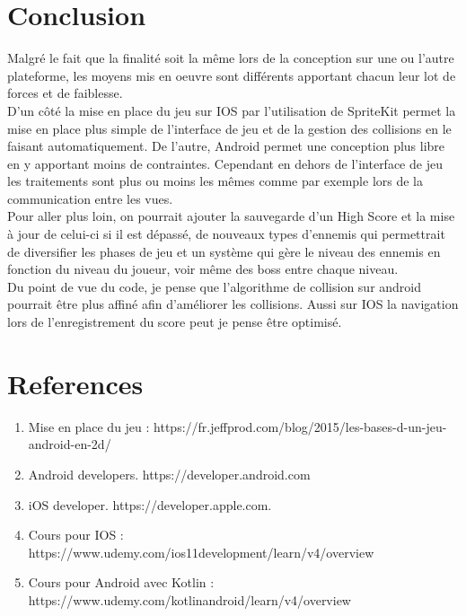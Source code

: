\documentclass{article}
\begin{document}
\section{Conclusion}
Malgré le fait que la finalité soit la même lors de la conception sur une ou l'autre plateforme, les moyens mis en oeuvre sont différents apportant chacun leur lot de forces et de faiblesse.\\
D'un côté la mise en place du jeu sur IOS par l'utilisation de SpriteKit permet la mise en place plus simple de l'interface de jeu et de la gestion des collisions en le faisant automatiquement. De l'autre, Android permet une conception plus libre en y apportant moins de contraintes. Cependant en dehors de l'interface de jeu les traitements sont plus ou moins les mêmes comme par exemple lors de la communication entre les vues.\\
Pour aller plus loin, on pourrait ajouter la sauvegarde d'un High Score et la mise à jour de celui-ci si il est dépassé, de nouveaux types d'ennemis qui permettrait de diversifier les phases de jeu et un système qui gère le niveau des ennemis en fonction du niveau du joueur, voir même des boss entre chaque niveau.\\
Du point de vue du code, je pense que l'algorithme de collision sur android pourrait être plus affiné afin d'améliorer les collisions.
Aussi sur IOS la navigation lors de l'enregistrement du score peut je pense être optimisé.

\section*{References}

\begin{enumerate}
    \item Mise en place du jeu : https://fr.jeffprod.com/blog/2015/les-bases-d-un-jeu-android-en-2d/
    \item Android developers. https://developer.android.com
    \item iOS developer. https://developer.apple.com.
    \item Cours pour IOS : https://www.udemy.com/ios11development/learn/v4/overview
    \item Cours pour Android avec Kotlin : https://www.udemy.com/kotlinandroid/learn/v4/overview
\end{enumerate}
\end{document}

